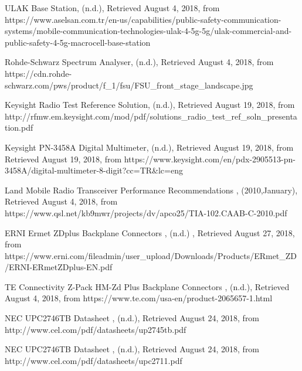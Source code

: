 \begin{thebibliography}{}
 ULAK Base Station, (n.d.), 
Retrieved August 4, 2018, from https://www.aselsan.com.tr/en-us/capabilities/public-safety-communication-systems/mobile-communication-technologies-ulak-4-5g-5g/ulak-commercial-and-public-safety-4-5g-macrocell-base-station


 Rohde-Schwarz Spectrum Analyser, (n.d.), 
Retrieved August 4, 2018, from https://cdn.rohde-schwarz.com/pws/product/f\_1/fsu/FSU\_front\_stage\_landscape.jpg

 Keysight Radio Test Reference Solution, (n.d.), 
Retrieved August 19, 2018, from http://rfmw.em.keysight.com/mod/pdf/solutions\_radio\_test\_ref\_soln\_presentation.pdf

 Keysight PN-3458A Digital Multimeter, (n.d.), 
Retrieved August 19, 2018, from Retrieved August 19, 2018, from https://www.keysight.com/en/pdx-2905513-pn-3458A/digital-multimeter-8-digit?cc=TR\&lc=eng


 Land Mobile Radio Transceiver Performance Recommendations , (2010,January), Retrieved August 4, 2018, from https://www.qsl.net/kb9mwr/projects/dv/apco25/TIA-102.CAAB-C-2010.pdf



 ERNI Ermet ZDplus Backplane Connectors , (n.d.) , Retrieved August 27, 2018, from https://www.erni.com/fileadmin/user\_upload/Downloads/Products/ERmet\_ZD/ERNI-ERmetZDplus-EN.pdf

 TE Connectivity Z-Pack HM-Zd Plus Backplane Connectors , (n.d.), Retrieved August 4, 2018, from https://www.te.com/usa-en/product-2065657-1.html

 NEC UPC2746TB Datasheet , (n.d.), Retrieved August 24, 2018, from http://www.cel.com/pdf/datasheets/up2745tb.pdf

 NEC UPC2746TB Datasheet  , (n.d.), Retrieved August 24, 2018, from http://www.cel.com/pdf/datasheets/upc2711.pdf


\end{thebibliography}

\endgroup

\vfill



%
%
%

